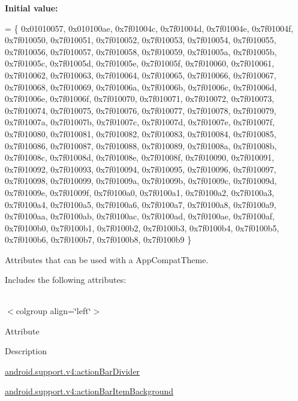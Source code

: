 {\bfseries Initial value\+:}
\begin{DoxyCode}
= \{
            0x01010057, 0x010100ae, 0x7f01004c, 0x7f01004d,
            0x7f01004e, 0x7f01004f, 0x7f010050, 0x7f010051,
            0x7f010052, 0x7f010053, 0x7f010054, 0x7f010055,
            0x7f010056, 0x7f010057, 0x7f010058, 0x7f010059,
            0x7f01005a, 0x7f01005b, 0x7f01005c, 0x7f01005d,
            0x7f01005e, 0x7f01005f, 0x7f010060, 0x7f010061,
            0x7f010062, 0x7f010063, 0x7f010064, 0x7f010065,
            0x7f010066, 0x7f010067, 0x7f010068, 0x7f010069,
            0x7f01006a, 0x7f01006b, 0x7f01006c, 0x7f01006d,
            0x7f01006e, 0x7f01006f, 0x7f010070, 0x7f010071,
            0x7f010072, 0x7f010073, 0x7f010074, 0x7f010075,
            0x7f010076, 0x7f010077, 0x7f010078, 0x7f010079,
            0x7f01007a, 0x7f01007b, 0x7f01007c, 0x7f01007d,
            0x7f01007e, 0x7f01007f, 0x7f010080, 0x7f010081,
            0x7f010082, 0x7f010083, 0x7f010084, 0x7f010085,
            0x7f010086, 0x7f010087, 0x7f010088, 0x7f010089,
            0x7f01008a, 0x7f01008b, 0x7f01008c, 0x7f01008d,
            0x7f01008e, 0x7f01008f, 0x7f010090, 0x7f010091,
            0x7f010092, 0x7f010093, 0x7f010094, 0x7f010095,
            0x7f010096, 0x7f010097, 0x7f010098, 0x7f010099,
            0x7f01009a, 0x7f01009b, 0x7f01009c, 0x7f01009d,
            0x7f01009e, 0x7f01009f, 0x7f0100a0, 0x7f0100a1,
            0x7f0100a2, 0x7f0100a3, 0x7f0100a4, 0x7f0100a5,
            0x7f0100a6, 0x7f0100a7, 0x7f0100a8, 0x7f0100a9,
            0x7f0100aa, 0x7f0100ab, 0x7f0100ac, 0x7f0100ad,
            0x7f0100ae, 0x7f0100af, 0x7f0100b0, 0x7f0100b1,
            0x7f0100b2, 0x7f0100b3, 0x7f0100b4, 0x7f0100b5,
            0x7f0100b6, 0x7f0100b7, 0x7f0100b8, 0x7f0100b9
        \}
\end{DoxyCode}
Attributes that can be used with a App\+Compat\+Theme. 

Includes the following attributes\+:

\tabulinesep=1mm
\begin{longtabu} spread 0pt [c]{*{0}{|X[-1]}|}
\hline
\end{longtabu}
$<$colgroup align=\char`\"{}left\char`\"{}$>$ 

Attribute

Description 

{\ttfamily \hyperlink{classandroid_1_1support_1_1v4_1_1R_1_1styleable_a0732bf3940b6c83753703acb180467fb}{android.\+support.\+v4\+:action\+Bar\+Divider}}

{\ttfamily \hyperlink{classandroid_1_1support_1_1v4_1_1R_1_1styleable_a60558b418ddb9737883935cae40a928c}{android.\+support.\+v4\+:action\+Bar\+Item\+Background}}

